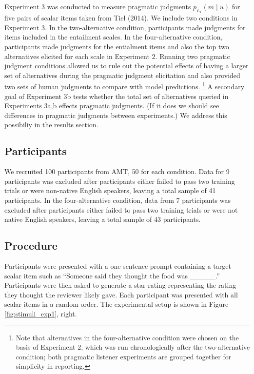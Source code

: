 \documentclass[10pt, letterpaper]{article}
\begin{document}
Experiment 3 was conducted to measure pragmatic judgments
\(p_{L_1}(m \mid u)\) for five pairs of scalar items taken from Tiel
(2014). We include two conditions in Experiment 3. In the
two-alternative condition, participants made judgments for items
included in the entailment scales. In the four-alternative condition,
participants made judgments for the entialment items and also the top
two alternatives elicited for each scale in Experiment 2. Running two
pragmatic judgment conditions allowed us to rule out the potential
effects of having a larger set of alternatives during the pragmatic
judgment elicitation and also provided two sets of human judgments to
compare with model predictions.
\footnote{Note that alternatives in the four-alternative condition were chosen on the basis of Experiment 2, which was run chronologically after the two-alternative condition; both pragmatic listener experiments are grouped together for simplicity in reporting.}
A secondary goal of Experiment 3b tests whether the total set of
alternatives queried in Experiments 3a,b effects pragmatic judgments.
(If it does we should see differences in pragmatic judgments between
experiments.) We address this possibiliy in the results section.

\subsection{Participants}\label{participants-2}

We recruited 100 participants from AMT, 50 for each condition. Data for
9 participants was excluded after participants either failed to pass two
training trials or were non-native English speakers, leaving a total
sample of 41 participants. In the four-alternative condition, data from
7 participants was excluded after participants either failed to pass two
training trials or were not native English speakers, leaving a total
sample of 43 participants.

\subsection{Procedure}\label{procedure}

Participants were presented with a one-sentence prompt containing a
target scalar item such as ``Someone said they thought the food was
\_\_\_\_\_.'' Participants were then asked to generate a star rating
representing the rating they thought the reviewer likely gave. Each
participant was presented with all scalar items in a random order. The
experimental setup is shown in Figure \ref{fig:stimuli_exp1}, right.
\end{document}
